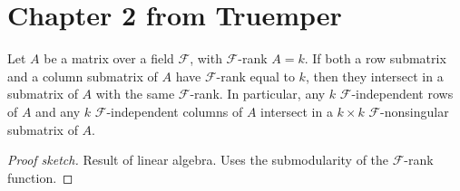 \section{Chapter 2 from Truemper}

\begin{lemma}[2.3.14]
  \label{lem:2.3.14}
  Let $A$ be a matrix over a field $\mathcal{F}$, with $\mathcal{F}$-rank $A = k$. If both a row submatrix and a column submatrix of $A$ have $\mathcal{F}$-rank equal to $k$, then they intersect in a submatrix of $A$ with the same $\mathcal{F}$-rank. In particular, any $k$ $\mathcal{F}$-independent rows of $A$ and any $k$ $\mathcal{F}$-independent columns of $A$ intersect in a $k \times k$ $\mathcal{F}$-nonsingular submatrix of $A$.
\end{lemma}

\begin{proof}[Proof sketch]
  Result of linear algebra. Uses the submodularity of the $\mathcal{F}$-rank function.
\end{proof}
